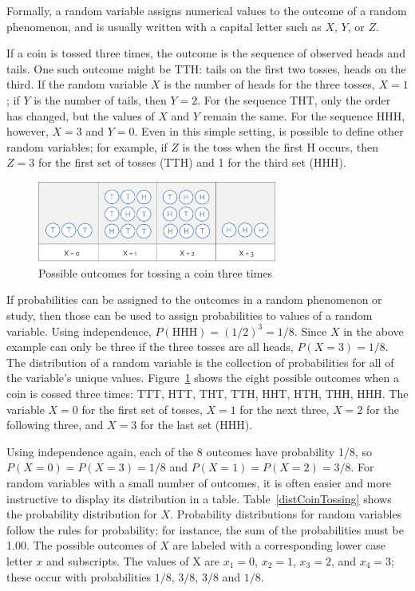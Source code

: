 Formally, a random variable assigns numerical values to the outcome of a random phenomenon, and is usually written with a capital letter such as $X$, $Y$, or $Z$. 

If a coin is tossed three times, the outcome is the sequence of observed heads and tails. One such outcome might be TTH: tails on the first two tosses, heads on the third. If the random variable $X$ is the number of heads for the three tosses, $X=1$; if $Y$ is the number of tails, then $Y=2$. For the sequence THT, only the order has changed, but the values of $X$ and $Y$ remain the same. For the sequence HHH, however, $X=3$ and $Y=0$. Even in this simple setting, is possible to define other random variables; for example, if $Z$ is the toss when the first H occurs, then $Z=3$ for the first set of tosses (TTH) and 1 for the third set (HHH).  

\begin{figure}[h]
	\centering
	\includegraphics[width=0.70\textwidth]
	{ch_probability_oi_biostat/figures/coinToss/coinToss.png}
	\caption{Possible outcomes for tossing a coin three times}
	\label{coinToss}
\end{figure}

If probabilities can be assigned to the outcomes in a random phenomenon or study, then those can be used to assign probabilities to values of a random variable.  Using independence, $P(\text{HHH}) = (1/2)^3 = 1/8$.  Since $X$ in the above example can only be three if the three tosses are all heads, $P(X=3) = 1/8$.  The distribution of a random variable is the collection of probabilities for all of the variable's unique values. Figure~\ref{coinToss} shows the eight possible outcomes when a coin is cossed three times: TTT, HTT, THT, TTH, HHT, HTH, THH, HHH. The variable $X = 0$ for the first set of tosses, $X = 1$ for the next three, $X = 2$ for the following three, and $X = 3$ for the last set (HHH).  

Using independence again, each of the 8 outcomes have probability 1/8, so $P(X = 0) = P(X = 3) = 1/8$ and $P(X = 1) = P(X = 2) = 3/8$. For random variables with a small number of outcomes, it is often easier and more instructive to display its distribution in a table. Table~\ref{distCoinTossing} shows the probability distribution for $X$.  Probability distributions for random variables follow the rules for probability; for instance, the sum of the probabilities must be 1.00.  The possible outcomes of $X$ are labeled with a corresponding lower case letter $x$ and subscripts.  The values of X are $x_1=0$, $x_2=1$,  $x_3 = 2$, and $x_4 = 3$; these occur with probabilities $1/8$, $3/8$, $3/8$ and $1/8$.

